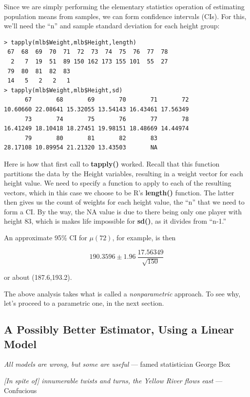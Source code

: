 Since we are simply performing the elementary statistics operation of
estimating population means from samples, we can form confidence
intervals (CIs).  For this, we'll need the ``n'' and sample standard
deviation for each height group:

\begin{lstlisting}
> tapply(mlb$Weight,mlb$Height,length)
 67  68  69  70  71  72  73  74  75  76  77  78 
  2   7  19  51  89 150 162 173 155 101  55  27 
 79  80  81  82  83 
 14   5   2   2   1 
> tapply(mlb$Weight,mlb$Height,sd)
      67       68       69       70       71       72 
10.60660 22.08641 15.32055 13.54143 16.43461 17.56349 
      73       74       75       76       77       78 
16.41249 18.10418 18.27451 19.98151 18.48669 14.44974 
      79       80       81       82       83 
28.17108 10.89954 21.21320 13.43503       NA 
\end{lstlisting}

Here is how that first call to {\bf tapply()} worked. Recall that this
function partitions the data by the Height variables, resulting in a
weight vector for each height value.  We need to specify a function to
apply to each of the resulting vectors, which in this case we choose to be R's
{\bf length()} function.  The latter then gives us the count of weights
for each height value, the ``n'' that we need to form a CI.
By the way, the NA value is due to there being only one player with
height 83, which is makes life impossible for {\bf sd()}, as it divides
from ``n-1.''

An approximate 95\% CI for $\mu(72)$, for example, is then

\begin{equation}
190.3596 \pm 1.96 ~ \frac{17.56349}{\sqrt{150}}
\end{equation}

or about (187.6,193.2).

The above analysis takes what is called a {\it nonparametric} approach.
To see why, let's proceed to a parametric one, in the next section.

\subsection{A Possibly Better Estimator, Using a Linear Model}
\label{betterlin}

{\it All models are wrong, but some are useful} --- famed statistician
George Box

{\it [In spite of] innumerable twists and turns, the Yellow River flows
east} --- Confucious
\vskip 0.2in

